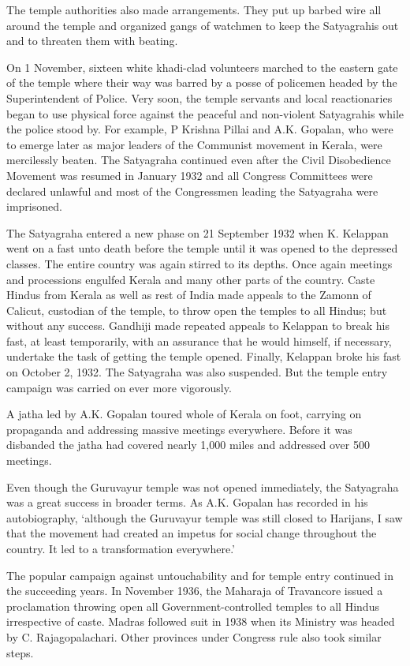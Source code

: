 The temple authorities also made arrangements. They put up barbed wire all around the temple and organized gangs of watchmen to keep the Satyagrahis out and to threaten them with beating.

On 1 November, sixteen white khadi-clad volunteers marched to the eastern gate of the temple where their way was barred by a posse of policemen headed by the Superintendent of Police. Very soon, the temple servants and local reactionaries began to use physical force against the peaceful and non-violent Satyagrahis while the police stood by. For example, P Krishna Pillai and A.K. Gopalan, who were to emerge later as major leaders of the Communist movement in Kerala, were mercilessly beaten. The Satyagraha continued even after the Civil Disobedience Movement was resumed in January 1932 and all Congress Committees were declared unlawful and most of the Congressmen leading the Satyagraha were imprisoned.

The Satyagraha entered a new phase on 21 September 1932 when K. Kelappan went on a fast unto death before the temple until it was opened to the depressed classes. The entire country was again stirred to its depths. Once again meetings and processions engulfed Kerala and many other parts of the country. Caste Hindus from Kerala as well as rest of India made appeals to the Zamonn of Calicut, custodian of the temple, to throw open the temples to all Hindus; but without any success. Gandhiji made repeated appeals to Kelappan to break his fast, at least temporarily, with an assurance that he would himself, if necessary, undertake the task of getting the temple opened. Finally, Kelappan broke his fast on October 2, 1932. The Satyagraha was also suspended. But the temple entry campaign was carried on ever more vigorously.

A jatha led by A.K. Gopalan toured whole of Kerala on foot, carrying on propaganda and addressing massive meetings everywhere. Before it was disbanded the jatha had covered nearly 1,000 miles and addressed over 500 meetings.

Even though the Guruvayur temple was not opened immediately, the Satyagraha was a great success in broader terms. As A.K. Gopalan has recorded in his autobiography, ‘although the Guruvayur temple was still closed to Harijans, I saw that the movement had created an impetus for social change throughout the country. It led to a transformation everywhere.’

The popular campaign against untouchability and for temple entry continued in the succeeding years. In November 1936, the Maharaja of Travancore issued a proclamation throwing open all Government-controlled temples to all Hindus irrespective of caste. Madras followed suit in 1938 when its Ministry was headed by C. Rajagopalachari. Other provinces under Congress rule also took similar steps.

